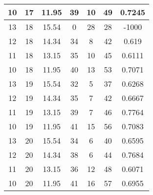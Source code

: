 \documentclass[letterpaper, 12pt]{article}
\begin{document}
\begin{longtable}{|c|c|c|c|c|c|c|}
\hline
10 & 17 & 11.95 & 39 & 10 & 49 & 0.7245 \\
\hline
13 & 18 & 15.54 & 0 & 28 & 28 & -1000 \\
\hline
12 & 18 & 14.34 & 34 & 8 & 42 & 0.619 \\
\hline
11 & 18 & 13.15 & 35 & 10 & 45 & 0.6111 \\
\hline
10 & 18 & 11.95 & 40 & 13 & 53 & 0.7071 \\
\hline
13 & 19 & 15.54 & 32 & 5 & 37 & 0.6268 \\
\hline
12 & 19 & 14.34 & 35 & 7 & 42 & 0.6667 \\
\hline
11 & 19 & 13.15 & 39 & 7 & 46 & 0.7764 \\
\hline
10 & 19 & 11.95 & 41 & 15 & 56 & 0.7083 \\
\hline
13 & 20 & 15.54 & 34 & 6 & 40 & 0.6595 \\
\hline
12 & 20 & 14.34 & 38 & 6 & 44 & 0.7684 \\
\hline
11 & 20 & 13.15 & 36 & 12 & 48 & 0.6071 \\
\hline
10 & 20 & 11.95 & 41 & 16 & 57 & 0.6955 \\
\hline
\end{longtable}
\end{document}
